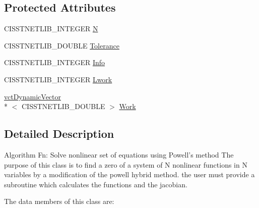 \subsection*{Protected Attributes}
\begin{DoxyCompactItemize}
\item 
C\-I\-S\-S\-T\-N\-E\-T\-L\-I\-B\-\_\-\-I\-N\-T\-E\-G\-E\-R \hyperlink{classnmr_fn_solver_a19a2ba2ba0e6e1f4ddd7eb137550c1d8}{N}
\item 
C\-I\-S\-S\-T\-N\-E\-T\-L\-I\-B\-\_\-\-D\-O\-U\-B\-L\-E \hyperlink{classnmr_fn_solver_acde9b05d6fb9fbc8aad45b2cbf63f6b6}{Tolerance}
\item 
C\-I\-S\-S\-T\-N\-E\-T\-L\-I\-B\-\_\-\-I\-N\-T\-E\-G\-E\-R \hyperlink{classnmr_fn_solver_a2c7acbdbe21f78d6e26b82fa502a9935}{Info}
\item 
C\-I\-S\-S\-T\-N\-E\-T\-L\-I\-B\-\_\-\-I\-N\-T\-E\-G\-E\-R \hyperlink{classnmr_fn_solver_a713fa3d60bd31f757d9c3cf04fc8f6c8}{Lwork}
\item 
\hyperlink{classvct_dynamic_vector}{vct\-Dynamic\-Vector}\\*
$<$ C\-I\-S\-S\-T\-N\-E\-T\-L\-I\-B\-\_\-\-D\-O\-U\-B\-L\-E $>$ \hyperlink{classnmr_fn_solver_ac641a0ef17a172725774a7b5703f95aa}{Work}
\end{DoxyCompactItemize}


\subsection{Detailed Description}
Algorithm Fn\-: Solve nonlinear set of equations using Powell's method The purpose of this class is to find a zero of a system of N nonlinear functions in N variables by a modification of the powell hybrid method. the user must provide a subroutine which calculates the functions and the jacobian.

The data members of this class are\-:


